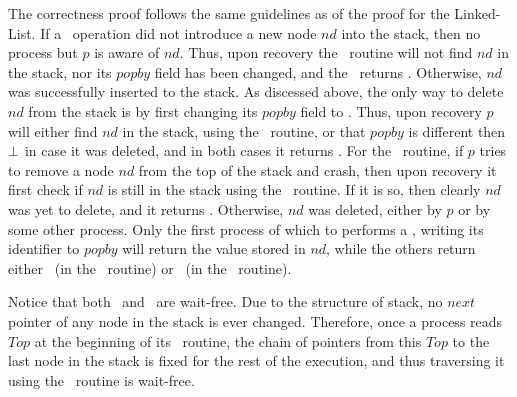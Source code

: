 The correctness proof follows the same guidelines as of the proof for the Linked-List. If a \push\ operation did not introduce a new node $nd$ into the stack, then no process but $p$ is aware of $nd$. Thus, upon recovery the \search\ routine will not find $nd$ in the stack, nor its $popby$ field has been changed, and the \recoverPush\ returns \fail. Otherwise, $nd$ was successfully inserted to the stack. As discessed above, the only way to delete $nd$ from the stack is by first changing its $popby$ field to \NULL. Thus, upon recovery $p$ will either find $nd$ in the stack, using the \search\ routine, or that $popby$ is different then $\mbox{$\bot$}$ in case it was deleted, and in both cases it returns \True.
For the \pop\ routine, if $p$ tries to remove a node $nd$ from the top of the stack and crash, then upon recovery it first check if $nd$ is still in the stack using the \search\ routine. If it is so, then clearly $nd$ was yet to delete, and it returns \fail. Otherwise, $nd$ was deleted, either by $p$ or by some other process. Only the first process of which to performs a \CAS, writing its identifier to $popby$ will return the value stored in $nd$, while the others return either \init\ (in the \trypop\ routine) or \fail\ (in the \recoverPop\ routine).

Notice that both \recoverPush\ and \recoverPop\ are wait-free. Due to the structure of stack, no $next$ pointer of any node in the stack is ever changed. Therefore, once a process reads $Top$ at the beginning of its \recover\ routine, the chain of pointers from this $Top$ to the last node in the stack is fixed for the rest of the execution, and thus traversing it using the \search\ routine is wait-free.




